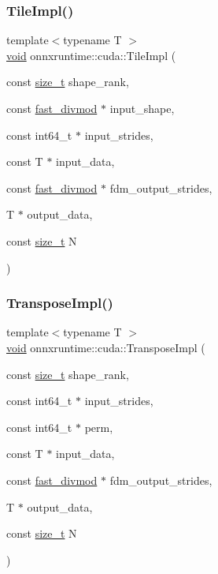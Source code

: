 \subsubsection{\texorpdfstring{Tile\+Impl()}{TileImpl()}}
{\footnotesize\ttfamily template$<$typename T $>$ \\
\mbox{\hyperlink{mlasi_8h_a88f941d423cb2a819b70a1358982b1a6}{void}} onnxruntime\+::cuda\+::\+Tile\+Impl (\begin{DoxyParamCaption}\item[{const \mbox{\hyperlink{mlasi_8h_a503efbc1c6e50825320ad909366b78ab}{size\+\_\+t}}}]{shape\+\_\+rank,  }\item[{const \mbox{\hyperlink{classonnxruntime_1_1cuda_1_1fast__divmod}{fast\+\_\+divmod}} $\ast$}]{input\+\_\+shape,  }\item[{const int64\+\_\+t $\ast$}]{input\+\_\+strides,  }\item[{const T $\ast$}]{input\+\_\+data,  }\item[{const \mbox{\hyperlink{classonnxruntime_1_1cuda_1_1fast__divmod}{fast\+\_\+divmod}} $\ast$}]{fdm\+\_\+output\+\_\+strides,  }\item[{T $\ast$}]{output\+\_\+data,  }\item[{const \mbox{\hyperlink{mlasi_8h_a503efbc1c6e50825320ad909366b78ab}{size\+\_\+t}}}]{N }\end{DoxyParamCaption})}

\mbox{\label{namespaceonnxruntime_1_1cuda_af64c8129bc67a4b75fe313352c808808}} 
\subsubsection{\texorpdfstring{Transpose\+Impl()}{TransposeImpl()}}
{\footnotesize\ttfamily template$<$typename T $>$ \\
\mbox{\hyperlink{mlasi_8h_a88f941d423cb2a819b70a1358982b1a6}{void}} onnxruntime\+::cuda\+::\+Transpose\+Impl (\begin{DoxyParamCaption}\item[{const \mbox{\hyperlink{mlasi_8h_a503efbc1c6e50825320ad909366b78ab}{size\+\_\+t}}}]{shape\+\_\+rank,  }\item[{const int64\+\_\+t $\ast$}]{input\+\_\+strides,  }\item[{const int64\+\_\+t $\ast$}]{perm,  }\item[{const T $\ast$}]{input\+\_\+data,  }\item[{const \mbox{\hyperlink{classonnxruntime_1_1cuda_1_1fast__divmod}{fast\+\_\+divmod}} $\ast$}]{fdm\+\_\+output\+\_\+strides,  }\item[{T $\ast$}]{output\+\_\+data,  }\item[{const \mbox{\hyperlink{mlasi_8h_a503efbc1c6e50825320ad909366b78ab}{size\+\_\+t}}}]{N }\end{DoxyParamCaption})}


